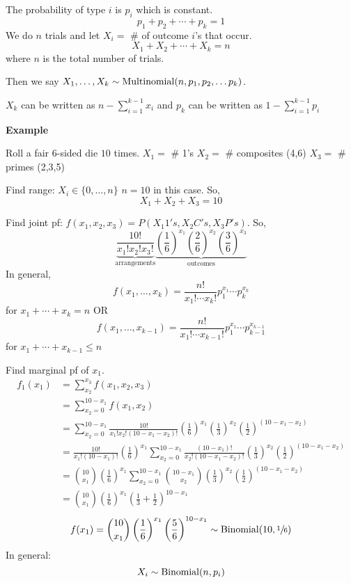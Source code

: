 The probability of type $ i $ is $ p_i $ which is constant.
\[ p_1+p_2+\cdots+p_k=1 \]
We do $ n $ trials and let $ X_i= $ \# of outcome $ i $'s that occur.
\[ X_1+X_2+\cdots+X_k=n \]
where $ n $ is the total number of trials.

Then we say $ X_1,\ldots ,X_k \sim \operatorname{Multinomial}(n,p_1,p_2,\ldots p_k) $.
\begin{remark}
    $ X_k $ can be written as $ n-\sum\limits_{i=1}^{k-1}x_i $ and
    $ p_k $ can be written as $ 1-\sum\limits_{i=1}^{k-1} p_i $
\end{remark}

\textbf{Example}

Roll a fair $6$-sided die $ 10 $ times.
$ X_1= $ \# 1's
$ X_2= $ \# composites (4,6)
$ X_3= $ \# primes (2,3,5)

Find range: $ X_i\in \{0,\ldots ,n\} $ $ n=10 $ in this case. So,
\[ X_1+X_2+X_3=10 \]

Find joint pf: $ f({x_1},{x_2},{x_3})=P(X_1 1's, X_2 C's, X_3 P's) $. So,
\[ \underbrace{\frac{10!}{{x_1}!{x_2}!{x_3}!}}_{\text{arrangements}}
    \underbrace{\left( \frac{1}{6}  \right)^{x_1}
        \left( \frac{2}{6} \right)^{x_2} \left( \frac{3}{6} \right)^{x_3}}_{\text{outcomes}}\]
In general,
\[ f({x_1},\ldots,x_k)=\frac{n!}{{x_1}!\cdots x_k!}p_1^{{x_1}} \cdots p_k^{x_k}\]
for $ {x_1}+\cdots+x_k=n $
OR
\[ f({x_1},\ldots,x_{k-1})=\frac{n!}{{x_1}!\cdots x_{k-1}!}p_1^{{x_1}} \cdots
    p_{k-1}^{x_{k-1}}\]
for $ {x_1}+\cdots+x_{k-1}\le n $

Find marginal pf of $ {x_1} $.
\begin{align*}
    f_1({x_1}) & =\sum\limits_{{x_2}}^{{x_3}} f({x_1},{x_2},{x_3})                           \\
               & =\sum\limits_{{x_2}=0}^{10-{x_1}} f({x_1},{x_2})                            \\
               & =\sum\limits_{{x_2}=0}^{10-{x_1}} \frac{10!}{{x_1}!{x_2}!(10-{x_1}-{x_2})!}
    \left( \frac{1}{6} \right)^{x_1}
    \left( \frac{1}{3} \right)^{x_2} \left( \frac{1}{2} \right)^{(10-{x_1}-{x_2})}           \\
               & =\frac{10!}{{x_1}!(10-{x_1})!}\left( \frac{1}{6}  \right)^{x_1}
    \sum\limits_{{x_2}=0}^{10-{x_1}} \frac{(10-{x_1})!}{{x_2}!(10-{x_1}-{x_2})!}
    \left( \frac{1}{3} \right)^{x_2} \left( \frac{1}{2} \right)^{(10-{x_1}-{x_2})}           \\
               & =\binom{10}{{x_1}}\left( \frac{1}{6}  \right)^{x_1}
    \sum\limits_{{x_2}=0}^{10-{x_1}} \binom{10-{x_1}}{{x_2}}
    \left( \frac{1}{3} \right)^{x_2} \left( \frac{1}{2} \right)^{(10-{x_1}-{x_2})}           \\
               & =\binom{10}{{x_1}}\left( \frac{1}{6}  \right)^{x_1}
    \left(\frac{1}{3}+\frac{1}{2} \right)^{10-x_1}
\end{align*}
\[ f(x_1)=\binom{10}{{x_1}}\left( \frac{1}{6}  \right)^{x_1}
    \left(\frac{5}{6} \right)^{10-x_1} \sim \operatorname{Binomial}(10,\sfrac{1}{6} )\]
In general:
\[ X_i \sim \operatorname{Binomial}(n,p_i) \]
